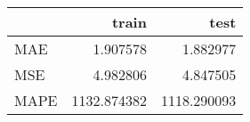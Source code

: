 \begin{tabular}{lrr}
\toprule
{} &        train &         test \\
\midrule
MAE  &     1.907578 &     1.882977 \\
MSE  &     4.982806 &     4.847505 \\
MAPE &  1132.874382 &  1118.290093 \\
\bottomrule
\end{tabular}
